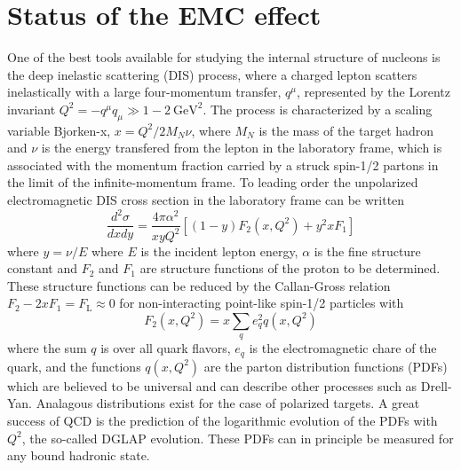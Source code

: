 \section{Status of the EMC effect}

One of the best tools available for studying the internal structure of nucleons is the deep inelastic
scattering (DIS) process, where a charged lepton scatters inelastically with a large four-momentum
transfer, $q^\mu$, represented by the Lorentz invariant $Q^2 = -q^\mu q_\mu \gg 1-2~\mathrm{GeV}^2$.
The process is characterized by a scaling variable Bjorken-x, $x = Q^2/2M_N \nu$, 
where $M_N$ is the mass of the target hadron and $\nu$ is the energy transfered from the lepton in the laboratory frame,
which is associated with the momentum fraction carried by a struck spin-1/2 partons in the limit of the infinite-momentum frame.
To leading order the unpolarized electromagnetic DIS cross section in the laboratory frame can be written~\cite{PhysRevD.98.030001}
\begin{equation}
    \frac{d^2 \sigma}{dx dy} = \frac{4 \pi \alpha^2}{x y Q^2} \left[ (1-y)F_2(x, Q^2) + y^2 x F_1 \right]
\end{equation}
where $y = \nu/E$ where $E$ is the incident lepton energy, $\alpha$ is the fine structure constant and $F_2$
and $F_1$ are structure functions of the proton to be determined.  These structure functions can be reduced
by the Callan-Gross relation $F_2 - 2xF_1 = F_\mathrm{L} \approx 0$ for non-interacting point-like spin-1/2
particles with
\begin{equation}
    F_2(x,Q^2) = x \sum_{q} e_q^2 q(x,Q^2)
\end{equation}
where the sum $q$ is over all quark flavors,  $e_q$ is the electromagnetic chare of the quark, and the
functions $q(x,Q^2)$ are the parton distribution functions (PDFs) which are believed to be universal
and can describe other processes such as Drell-Yan.  Analagous distributions exist for the case of polarized
targets.  A great success of QCD is the prediction of the logarithmic 
evolution of the PDFs with $Q^2$, the so-called DGLAP evolution.  These PDFs can in principle be measured for any bound hadronic state.

